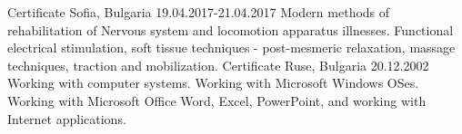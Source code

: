 \cventry
{Certificate}
{Sofia, Bulgaria 19.04.2017-21.04.2017}
{
Modern methods of rehabilitation of Nervous system and locomotion apparatus illnesses. Functional electrical stimulation, soft tissue techniques - post-mesmeric relaxation, massage techniques,  traction and mobilization.
}
\vspace{+3mm}
\cventry
{Certificate}
{Ruse, Bulgaria 20.12.2002}
{
Working with computer systems. Working with Microsoft Windows OSes. Working with Microsoft Office Word, Excel, PowerPoint, and working with Internet applications. 
}
